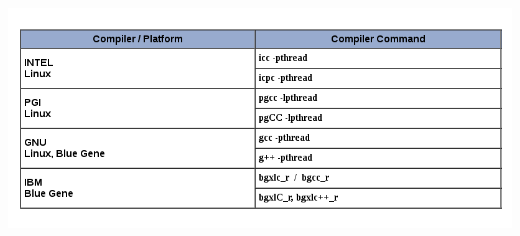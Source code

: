 \documentclass[10pt, xcolor=x11names]{beamer}
\begin{document}
\begin{frame}
	\begin{flushleft}
	\includegraphics[width=1.1\linewidth]{img/compiling.png}
	\end{flushleft}
\end{frame}
\end{document}
